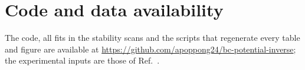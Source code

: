 \documentclass[10pt,twocolumn]{article}
\begin{document}
\section*{Code and data availability}
The code, all fits in the stability scans and the scripts that regenerate every table and figure are available at \url{https://github.com/apoppong24/bc-potential-inverse}; the experimental inputs are those of Ref.~\cite{Oppong2026}.



\end{document}
